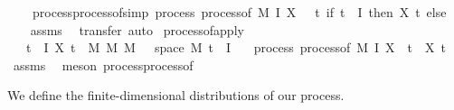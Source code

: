 \begin{isabellebody}
\ \ \ \ process{\isacharunderscore}{\kern0pt}process{\isacharunderscore}{\kern0pt}of{\isacharbrackleft}{\kern0pt}simp{\isacharbrackright}{\kern0pt}{\isacharcolon}{\kern0pt}\ {\isachardoublequoteopen}process\ {\isacharparenleft}{\kern0pt}process{\isacharunderscore}{\kern0pt}of\ M{\isacharprime}{\kern0pt}\ I\ X\ {\isasymomega}{\isacharparenright}{\kern0pt}\ {\isacharequal}{\kern0pt}\ {\isacharparenleft}{\kern0pt}{\isasymlambda}t{\isachardot}{\kern0pt}\ if\ t\ {\isasymin}\ I\ then\ X\ t\ else\ {\isacharparenleft}{\kern0pt}{\isasymlambda}{\isacharunderscore}{\kern0pt}{\isachardot}{\kern0pt}\ {\isasymomega}{\isacharparenright}{\kern0pt}{\isacharparenright}{\kern0pt}{\isachardoublequoteclose}\isanewline
%
\isadelimproof
\ \ %
\endisadelimproof
%
\isatagproof
{}\isamarkupfalse%
\ assms\ \isamarkupfalse%
\ {\isacharparenleft}{\kern0pt}transfer{\isacharcomma}{\kern0pt}\ auto{\isacharparenright}{\kern0pt}{\isacharplus}{\kern0pt}%
\endisatagproof
{\isafoldproof}%
%
\isadelimproof
\isanewline
%
\endisadelimproof
\isanewline
{}\isamarkupfalse%
\ process{\isacharunderscore}{\kern0pt}of{\isacharunderscore}{\kern0pt}apply{\isacharcolon}{\kern0pt}\isanewline
\ \ \ {\isachardoublequoteopen}{\isasymforall}t\ {\isasymin}\ I{\isachardot}{\kern0pt}\ X\ t\ {\isasymin}\ M\ {\isasymrightarrow}\isactrlsub M\ M{\isacharprime}{\kern0pt}{\isachardoublequoteclose}\ {\isachardoublequoteopen}{\isasymomega}\ {\isasymin}\ space\ M{\isacharprime}{\kern0pt}{\isachardoublequoteclose}\ {\isachardoublequoteopen}t\ {\isasymin}\ I{\isachardoublequoteclose}\isanewline
\ \ \ {\isachardoublequoteopen}process\ {\isacharparenleft}{\kern0pt}process{\isacharunderscore}{\kern0pt}of\ M{\isacharprime}{\kern0pt}\ I\ X\ {\isasymomega}{\isacharparenright}{\kern0pt}\ t\ {\isacharequal}{\kern0pt}\ X\ t{\isachardoublequoteclose}\isanewline
%
\isadelimproof
\ \ %
\endisadelimproof
%
\isatagproof
{}\isamarkupfalse%
\ assms\ \isamarkupfalse%
\ {\isacharparenleft}{\kern0pt}meson\ process{\isacharunderscore}{\kern0pt}process{\isacharunderscore}{\kern0pt}of{\isacharparenright}{\kern0pt}%
\endisatagproof
{\isafoldproof}%
%
\isadelimproof
\isanewline
%
\endisadelimproof
{}\isamarkupfalse%
%
\begin{isamarkuptext}%
We define the finite-dimensional distributions of our process.%
\end{isamarkuptext}\isamarkuptrue%
%
\end{isabellebody}
